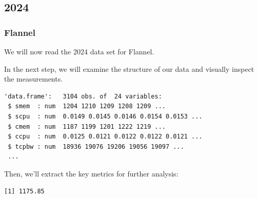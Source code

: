 \subsection{2024}

\subsubsection{Flannel}

We will now read the 2024 data set for Flannel.

\begin{Shaded}
\begin{Highlighting}[]
\OtherTok{\textless{}{-}} 
\OtherTok{\textless{}{-}} \NormalTok{(}\NormalTok{,}\NormalTok{))}
\end{Highlighting}
\end{Shaded}

In the next step, we will examine the structure of our data and visually
inspect the measurements.

\begin{Shaded}
\begin{Highlighting}[]
\end{Highlighting}
\end{Shaded}

\begin{verbatim}
'data.frame':   3104 obs. of  24 variables:
 $ smem  : num  1204 1210 1209 1208 1209 ...
 $ scpu  : num  0.0149 0.0145 0.0146 0.0154 0.0153 ...
 $ cmem  : num  1187 1199 1201 1222 1219 ...
 $ ccpu  : num  0.0125 0.0121 0.0122 0.0122 0.0121 ...
 $ tcpbw : num  18936 19076 19206 19056 19097 ...
 ...
\end{verbatim}

Then, we'll extract the key metrics for further analysis:

\begin{Shaded}
\begin{Highlighting}[]
\SpecialCharTok{\$}
\end{Highlighting}
\end{Shaded}

\begin{verbatim}
[1] 1175.85
\end{verbatim}

\begin{Shaded}
\begin{Highlighting}[]
\SpecialCharTok{\$}
\end{Highlighting}
\end{Shaded}

